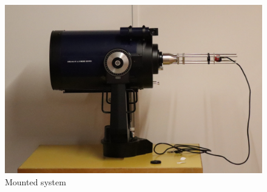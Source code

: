 \begin{figure}[H]
    \centering
    \includegraphics[scale=0.1]{assets/figures/System/IMG_5308.JPG}
    \caption{Mounted system}
    \label{fig:GLOB_Syst}
\end{figure}
\newpage
